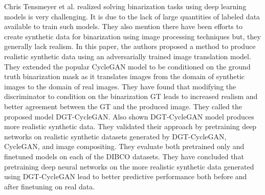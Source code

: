 Chris Tensmeyer et al.\cite{8978087} realized solving binarization tasks using deep learning models is very challenging. It is due to the lack of large quantities of labeled data available to train such models. They also mention there have been efforts to create synthetic data for binarization using image processing techniques but, they generally lack realism. In this paper, the authors proposed a method to produce realistic synthetic data using an adversarially trained image translation model. They extended the popular \ac{CycleGAN} model to be conditioned on the ground truth binarization mask as it translates images from the domain of synthetic images to the domain of real images. They have found that modifying the discriminator to condition on the binarization \ac{GT} leads to increased realism and better agreement between the \ac{GT} and the produced image. They called the proposed model DGT-CycleGAN. Also shown DGT-CycleGAN model produces more realistic synthetic data. They validated their approach by pretraining deep networks on realistic synthetic datasets generated by DGT-CycleGAN, \ac{CycleGAN}, and image compositing. They evaluate both pretrained only and finetuned models on each of the \ac{DIBCO} datasets. They have concluded that pretraining deep neural networks on the more realistic synthetic data generated using DGT-CycleGAN lead to better predictive performance both before and after finetuning on real data.



